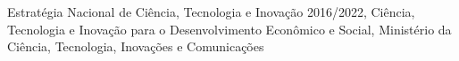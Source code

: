 \documentclass[
12pt,		%
openright,	%
twoside,  %
a4paper,			%
chapter=TITLE,		%
english,			%
french,				%
spanish,			%
brazil				%
]{USPSC-classe/USPSC}
\begin{document}
\begin{flushleft}
\begin{flushleft}
\begin{flushleft}
\begin{flushleft}
\begin{flushleft}
\begin{flushleft}
\begin{flushleft}
\begin{flushleft}
\begin{flushleft}
\begin{flushleft}
[ENCTI, 2016] Estrat\'egia Nacional de Ci\^encia, Tecnologia e Inova\c{c}\~ao 2016/2022, Ci\^encia, Tecnologia e Inova\c{c}\~ao para o Desenvolvimento Econ\^omico e Social, Minist\'erio da Ci\^encia, Tecnologia, Inova\c{c}\~oes e Comunica\c{c}\~oes
\end{flushleft}


\end{flushleft}


\end{flushleft}


\end{flushleft}


\end{flushleft}


\end{flushleft}


\end{flushleft}


\end{flushleft}


\end{flushleft}


\end{flushleft}
\end{document}
